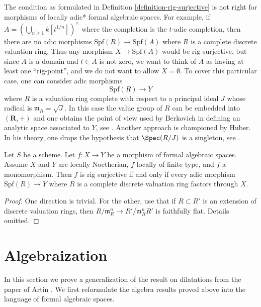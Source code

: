 \begin{remark}
\label{remark-rig-surjective-more-general}
The condition as formulated in Definition \ref{definition-rig-surjective}
is not right for morphisms of locally adic* formal algebraic spaces.
For example, if $A = (\bigcup_{n \geq 1} k[t^{1/n}])^\wedge$
where the completion is the $t$-adic completion, then
there are no adic morphisms $\text{Spf}(R) \to \text{Spf}(A)$
where $R$ is a complete discrete valuation ring.
Thus any morphism $X \to \text{Spf}(A)$ would be rig-surjective,
but since $A$ is a domain and $t \in A$ is not zero, we want to
think of $A$ as having at least one ``rig-point'', and we do not
want to allow $X = \emptyset$. To cover this
particular case, one can consider adic morphisms
$$
\text{Spf}(R) \longrightarrow Y
$$
where $R$ is a valuation ring complete with respect to a principal
ideal $J$ whose radical is $\mathfrak m_R = \sqrt{J}$.
In this case the value group of $R$ can be embedded into
$(\mathbf{R}, +)$ and one obtains the point of view used by
Berkovich in defining an analytic space associated to $Y$, see
\cite{Berkovich}. Another approach is championed by Huber. In his theory,
one drops the hypothesis that $\Spec(R/J)$ is a singleton, see
\cite{Huber-continuous-valuations}.
\end{remark}

\begin{lemma}
\label{lemma-monomorphism-rig-surjective}
Let $S$ be a scheme. Let $f : X \to Y$ be a morphism of formal algebraic
spaces. Assume $X$ and $Y$ are locally Noetherian, $f$ locally of finite
type, and $f$ a monomorphism. Then $f$ is rig surjective if and only if
every adic morphism $\text{Spf}(R) \to Y$ where $R$ is a complete discrete
valuation ring factors through $X$.
\end{lemma}

\begin{proof}
One direction is trivial. For the other, use that if $R \subset R'$
is an extension of discrete valuation rings, then
$R/\mathfrak m_R^n \to R'/\mathfrak m_R^n R'$ is faithfully flat.
Details omitted.
\end{proof}





\section{Algebraization}
\label{section-algebraization}

\noindent
In this section we prove a generalization of the result on dilatations
from the paper of Artin \cite{ArtinII}. We first reformulate the algebra
results proved above into the language of formal algebraic spaces.

